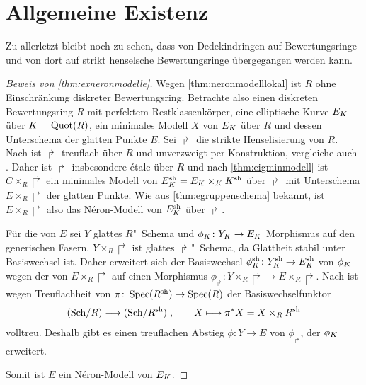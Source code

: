 \section{Allgemeine Existenz}\label{chap:exneronmodellebeweis}
Zu allerletzt bleibt noch zu sehen, dass von Dedekindringen
auf Bewertungsringe und von dort auf strikt henselsche Bewertungsringe
übergegangen werden kann.
\begin{proof}[Beweis von \ref{thm:exneronmodelle}]
  Wegen \ref{thm:neronmodelllokal} ist $R$ ohne Einschränkung
  diskreter Bewertungsring.
  Betrachte also einen diskreten Bewertungsring $R$ mit perfektem
  Restklassenkörper, eine elliptische Kurve $E_{K}$ über $K=\operatorname{Quot}(R)$,
  ein minimales Modell $X$ von $E_{K}$ über $R$ und dessen Unterschema
  der glatten Punkte $E$.
  Sei $\Rsh$ die strikte Henselisierung von $R$.
  Nach \cite[Chapter~2.4, Corollary~9]{neron} ist $\Rsh$ treuflach
  über $R$ und unverzweigt per Konstruktion, vergleiche auch
  \cite[Chapter~2.3, Proposition~11]{neron}.
  Daher ist $\Rsh$ insbesondere étale über $R$ und nach
  \ref{thm:eigminmodell} ist $C\times_R\Rsh$ ein minimales Modell von
  ${E_\Ksh=E_\K\times_\K\Ksh}$ über $\Rsh$ mit Unterschema
  $E\times_R\Rsh$ der glatten Punkte.
  Wie aus \ref{thm:egruppenschema} bekannt, ist $E\times_R\Rsh$ also
  das Néron-Modell von $E_\Ksh$ über $\Rsh$.

  Für die \NAbbEig von $E$ sei $Y$ glattes $R$"~Schema und
  ${\phi_{K}\colon Y_{K}\to E_{K}}$ Morphismus auf den generischen Fasern.
  $Y\times_R\Rsh$ ist glattes $\Rsh$"~Schema, da Glattheit stabil unter
  Basiswechsel ist. Daher erweitert sich der Basiswechsel
  ${\phi_\Ksh\colon Y_\Ksh\to E_\Ksh}$ von $\phi_{K}$ wegen der \NAbbEig
  von $E\times_R\Rsh$ auf einen Morphismus
  ${\phi_\Rsh\colon Y\times_R\Rsh\to E\times_R\Rsh}$.
  Nach \cite[Chapter~6.1, Theorem~6]{neron} ist wegen Treuflachheit
  von ${\pi\colon\operatorname{Spec}(R^{\text{sh}})\to\operatorname{Spec}(R)}$ der Basiswechselfunktor
  \begin{gather*}
    \text{(Sch/$R$)}\longto\text{(Sch/$\Rsh$)}\;,
    \qquad
    X\longmapsto \pi^*X=X\times_R\Rsh
  \end{gather*}
  volltreu. Deshalb gibt es einen treuflachen Abstieg
  ${\phi\colon Y\to E}$ von $\phi_\Rsh$, der $\phi_{K}$ erweitert.

  Somit ist $E$ ein Néron-Modell von $E_{K}$.
\end{proof}

